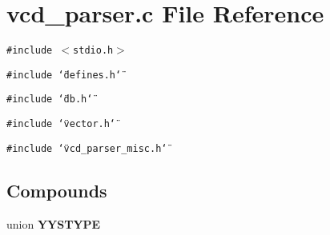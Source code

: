 \section{vcd\_\-parser.c File Reference}
\label{vcd__parser_8c}
{\tt \#include $<$stdio.h$>$}\par
{\tt \#include \char`\"{}defines.h\char`\"{}}\par
{\tt \#include \char`\"{}db.h\char`\"{}}\par
{\tt \#include \char`\"{}vector.h\char`\"{}}\par
{\tt \#include \char`\"{}vcd\_\-parser\_\-misc.h\char`\"{}}\par
\subsection*{Compounds}
\begin{CompactItemize}
\item 
union {\bf YYSTYPE}
\end{CompactItemize}
